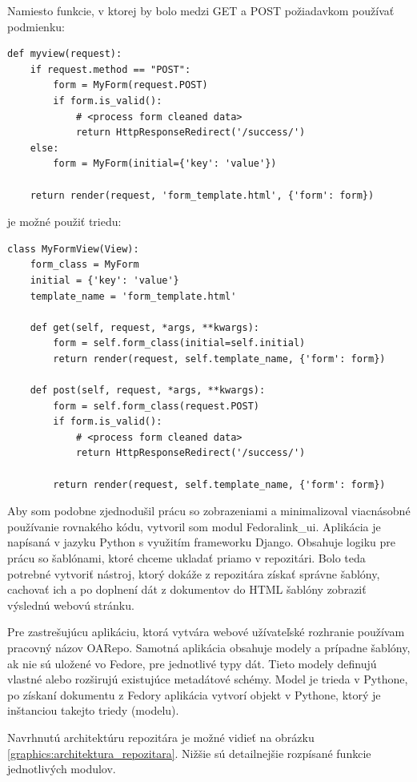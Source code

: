 \documentclass[thesis=M,slovak]{FITthesis}[2013/05/06]
\begin{document}
Namiesto funkcie, v ktorej by bolo medzi GET a POST požiadavkom používať podmienku:
\begin{lstlisting}[frame=single] 
def myview(request):
    if request.method == "POST":
        form = MyForm(request.POST)
        if form.is_valid():
            # <process form cleaned data>
            return HttpResponseRedirect('/success/')
    else:
        form = MyForm(initial={'key': 'value'})

    return render(request, 'form_template.html', {'form': form})
\end{lstlisting}
je možné použiť triedu:
\begin{lstlisting}[frame=single] 
class MyFormView(View):
    form_class = MyForm
    initial = {'key': 'value'}
    template_name = 'form_template.html'

    def get(self, request, *args, **kwargs):
        form = self.form_class(initial=self.initial)
        return render(request, self.template_name, {'form': form})

    def post(self, request, *args, **kwargs):
        form = self.form_class(request.POST)
        if form.is_valid():
            # <process form cleaned data>
            return HttpResponseRedirect('/success/')

        return render(request, self.template_name, {'form': form})
\end{lstlisting}

Aby som podobne zjednodušil prácu so zobrazeniami a minimalizoval viacnásobné používanie rovnakého kódu, vytvoril som modul Fedoralink\_ui. Aplikácia je napísaná v jazyku Python s využitím frameworku Django. Obsahuje logiku pre prácu so šablónami, ktoré chceme ukladať priamo v repozitári. Bolo teda potrebné vytvoriť nástroj, ktorý dokáže z repozitára získať správne šablóny, cachovať ich a po doplnení dát z dokumentov do HTML šablóny zobraziť výslednú webovú stránku.

Pre zastrešujúcu aplikáciu, ktorá vytvára webové užívateľské rozhranie používam pracovný názov OARepo. Samotná aplikácia obsahuje modely a prípadne šablóny, ak nie sú uložené vo Fedore, pre jednotlivé typy dát. Tieto modely definujú vlastné alebo rozširujú existujúce metadátové schémy. Model je trieda v Pythone, po získaní dokumentu z Fedory aplikácia vytvorí objekt v Pythone, ktorý je inštanciou takejto triedy (modelu).

Navrhnutú architektúru repozitára je možné vidieť na obrázku \ref{graphics:architektura_repozitara}. Nižšie sú detailnejšie rozpísané funkcie jednotlivých modulov.
\end{document}
